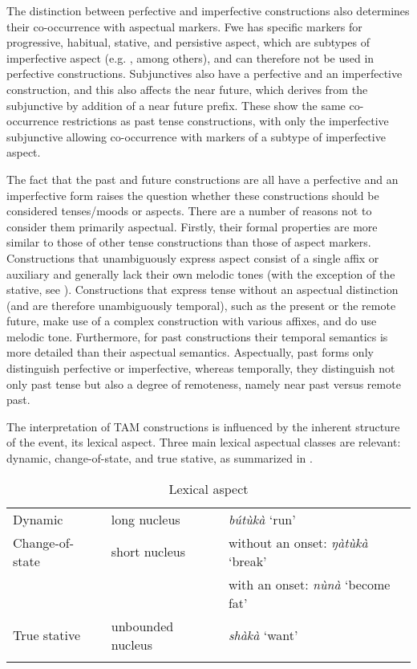The distinction between perfective and imperfective constructions also determines their co-occurrence with aspectual markers. Fwe has specific markers for progressive, habitual, stative, and persistive aspect, which are subtypes of imperfective aspect (e.g. \citealt{Comrie1976}, among others), and can therefore not be used in perfective constructions. Subjunctives also have a perfective and an imperfective construction, and this also affects the near future, which derives from the subjunctive by addition of a near future prefix. These show the same co-occurrence restrictions as past tense constructions, with only the imperfective subjunctive allowing co-occurrence with markers of a subtype of imperfective aspect.

The fact that the past and future constructions are all have a perfective and an imperfective form raises the question whether these constructions should be considered tenses/moods or aspects. There are a number of reasons not to consider them primarily aspectual. Firstly, their formal properties are more similar to those of other tense constructions than those of aspect markers. Constructions that unambiguously express aspect consist of a single affix or auxiliary and generally lack their own melodic tones (with the exception of the stative, see ). Constructions that express tense without an aspectual distinction (and are therefore unambiguously temporal), such as the present or the remote future, make use of a complex construction with various affixes, and do use melodic tone. Furthermore, for past constructions their temporal semantics is more detailed than their aspectual semantics. Aspectually, past forms only distinguish perfective or imperfective, whereas temporally, they distinguish not only past tense but also a degree of remoteness, namely near past versus remote past.

The interpretation of TAM constructions is influenced by the inherent structure of the event, its lexical aspect. Three main lexical aspectual classes are relevant: dynamic, change-of-state, and true stative, as summarized in .

\begin{table}
\label{bkm:Ref492291890}\caption{\label{tab:8:1}Lexical aspect}
\begin{tabularx}{\textwidth}{Xll}
\lsptoprule
Dynamic & long nucleus & \textit{bútùkà} ‘run’\\
Change-of-state & short nucleus & without an onset: \textit{ŋàtùkà} ‘break’\\
&  & with an onset: \textit{nùnà} ‘become fat’\\
True stative & unbounded nucleus & \textit{shàkà} ‘want’\\
\lspbottomrule
\end{tabularx}
\end{table}

